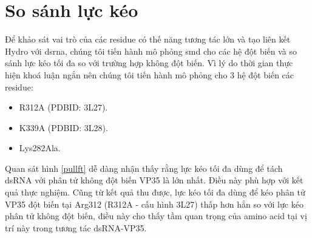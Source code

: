 \documentclass[12pt,a4paper,reqno, oneside]{book}
\begin{document}
\section{So sánh lực kéo}
Để khảo sát vai trò của các \gls{residue} có thế năng tương tác lớn và tạo liên kết Hydro với \gls{dsrna}, chúng tôi tiến hành mô phỏng \gls{smd} cho các hệ đột biến và so sánh lực kéo tối đa so với trường hợp không đột biến. Vì lý do thời gian thực hiện khoá luận ngắn nên chúng tôi tiến hành mô phỏng cho 3 hệ đột biến các \gls{residue}:
\begin{itemize}
\item \gls{R312A} (PDBID: 3L27).
\item \gls{K339A} (PDBID: 3L28).
\item Lys282Ala.
\end{itemize}
Quan sát hình \ref{pullft} dễ dàng nhận thấy rằng lực kéo tối đa dùng để tách dsRNA với phân tử không đột biến VP35 là lớn nhất. Điều này phù hợp với kết quả thực nghiệm\cite{Leung2010}. Cũng từ kết quả thu được, lực kéo tối đa dùng để kéo phân tử VP35 đột biến tại Arg312 (\gls{R312A} - cấu hình 3L27) thấp hơn hẳn so với lực kéo phân tử không đột biến, điều này cho thấy tầm quan trọng của amino acid tại vị trí này trong tương tác dsRNA-VP35.
\end{document}
